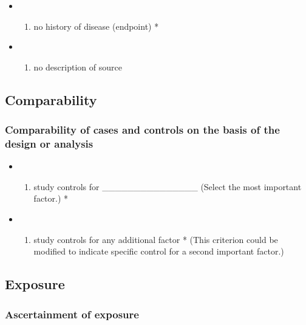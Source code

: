 \documentclass[
  doc, a4paper]{apa7}
\providecommand{\tightlist}{%
  \setlength{\itemsep}{0pt}\setlength{\parskip}{0pt}}
\begin{document}
\begin{itemize}
\tightlist
\item
  \begin{enumerate}
  \def\labelenumi{\alph{enumi})}
  \tightlist
  \item
    no history of disease (endpoint) *
  \end{enumerate}
\item
  \begin{enumerate}
  \def\labelenumi{\alph{enumi})}
  \setcounter{enumi}{1}
  \tightlist
  \item
    no description of source
  \end{enumerate}
\end{itemize}

\subsection{Comparability}\label{comparability}

\subsubsection{Comparability of cases and controls on the basis of the design or analysis}\label{comparability-of-cases-and-controls-on-the-basis-of-the-design-or-analysis}

\begin{itemize}
\tightlist
\item
  \begin{enumerate}
  \def\labelenumi{\alph{enumi})}
  \tightlist
  \item
    study controls for \_\_\_\_\_\_\_\_\_\_\_\_\_\_\_ (Select the most important factor.) *
  \end{enumerate}
\item
  \begin{enumerate}
  \def\labelenumi{\alph{enumi})}
  \setcounter{enumi}{1}
  \tightlist
  \item
    study controls for any additional factor * (This criterion could be modified to indicate specific control for a second important factor.)
  \end{enumerate}
\end{itemize}

\subsection{Exposure}\label{exposure}

\subsubsection{Ascertainment of exposure}\label{ascertainment-of-exposure}
\end{document}
